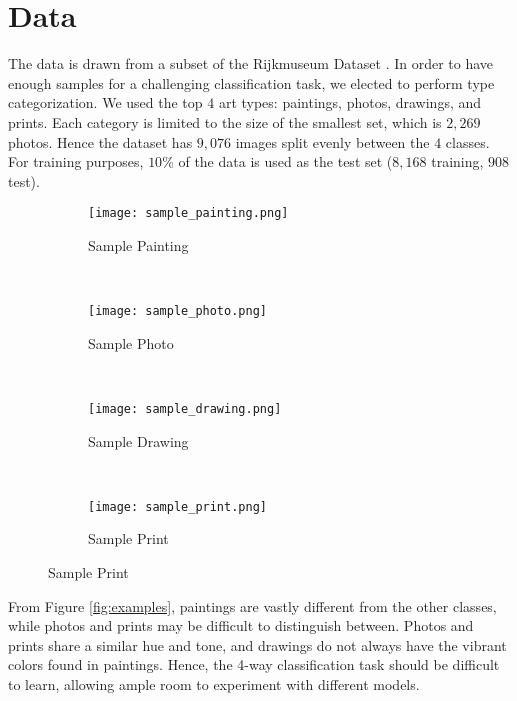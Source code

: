 \documentclass{article}
\begin{document}
\section{Data}
\label{sec:data}
The data is drawn from a subset of the Rijkmuseum Dataset \cite{Rijksmuseum}.
In order to have enough samples for a challenging classification task, we
elected to perform type categorization. We used the top $4$ art types: paintings,
photos, drawings, and prints. Each category is limited to the size of the
smallest set, which is $2,269$ photos. Hence the dataset has $9,076$ images
split evenly between the $4$ classes. For training purposes, $10$\% of the
data is used as the test set ($8,168$ training, $908$ test).

 \begin{figure}[h!]
   \caption{Class Examples}
   \vspace{-5pt}
   \label{fig:examples}
   \begin{subfigure}[b]{0.23\textwidth}
     \centering
     \texttt{[image: sample\_painting.png]}
     \caption{Sample Painting}
     \label{fig:painting}
   \end{subfigure}
   ~
   \begin{subfigure}[b]{0.23\textwidth}
     \centering
     \texttt{[image: sample\_photo.png]}
     \caption{Sample Photo}
     \label{fig:photo}
   \end{subfigure}
   ~
   \begin{subfigure}[b]{0.23\textwidth}
     \centering
     \texttt{[image: sample\_drawing.png]}
     \caption{Sample Drawing}
     \label{fig:drawing}
   \end{subfigure}
   ~
   \begin{subfigure}[b]{0.23\textwidth}
     \centering
     \texttt{[image: sample\_print.png]}
     \caption{Sample Print}
     \label{fig:print}
   \end{subfigure}
 \end{figure}

From Figure \ref{fig:examples}, paintings are vastly different
from the other classes, while photos and prints may be difficult to distinguish
between. Photos and prints share a similar hue and tone, and drawings do not
always have the vibrant colors found in paintings. Hence, the 4-way
classification task should be difficult to learn, allowing ample room to
experiment with different models.


\end{document}
